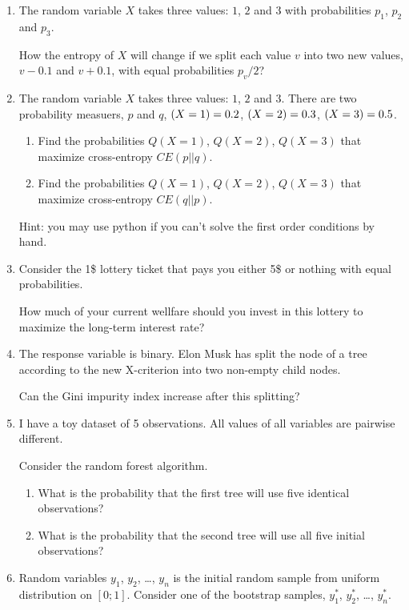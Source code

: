 \documentclass[12pt]{article}
\let\P\relax
\DeclareMathOperator{\P}{\mathbb{P}}
\begin{document}
\begin{enumerate}
\item The random variable $X$ takes three values: $1$, $2$ and $3$ with probabilities $p_1$, $p_2$ and $p_3$.

How the entropy of $X$ will change if we split each value $v$ into two new values, $v-0.1$ and $v+0.1$, 
with equal probabilities $p_v/2$?
    

\item The random variable $X$ takes three values: $1$, $2$ and $3$. 
There are two probability measuers, $p$ and $q$, $\P(X=1) = 0.2$, $\P(X=2) = 0.3$, $\P(X=3) = 0.5$.

\begin{enumerate}
    \item Find the probabilities $Q(X=1)$, $Q(X=2)$, $Q(X=3)$ that maximize cross-entropy $CE(p||q)$.
    \item Find the probabilities $Q(X=1)$, $Q(X=2)$, $Q(X=3)$ that maximize cross-entropy $CE(q||p)$.
\end{enumerate}

Hint: you may use python if you can't solve the first order conditions by hand. 

\item Consider the 1\$ lottery ticket that pays you either 5\$ or nothing with equal probabilities.

How much of your current wellfare should you invest in this lottery to maximize the long-term interest rate?

\item The response variable is binary. 
Elon Musk has split the node of a tree according to the new X-criterion
into two non-empty child nodes. 

Can the Gini impurity index increase after this splitting?


\item I have a toy dataset of 5 observations. 
All values of all variables are pairwise different.

Consider the random forest algorithm. 

\begin{enumerate}
    \item What is the probability that the first tree will use five identical observations?
    \item What is the probability that the second tree will use all five initial observations?
\end{enumerate}
\item Random variables $y_1$, $y_2$, \ldots, $y_n$ is the initial random sample from uniform 
distribution on $[0;1]$. 
Consider one of the bootstrap samples, $y_1^*$, $y_2^*$, \ldots, $y_n^*$.


\end{enumerate}
\end{document}
